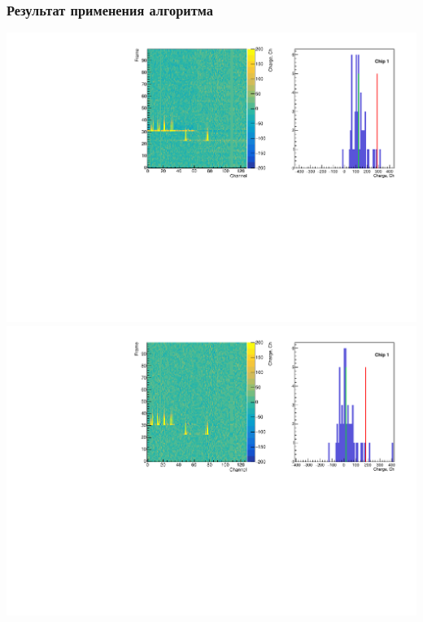 \documentclass[14pt]{beamer}
\newcommand{\backupend}{
	\setcounter{framenumber}{\value{finalframe}}
}
\begin{document}
\begin{frame}[t]
\frametitle{Результат применения алгоритма}
\vspace{0pt}
\centering \includegraphics[height=0.4\textheight, width=0.7\linewidth]{median_hist_unbiased.pdf}
\includegraphics[height=0.4\textheight,width=0.7\linewidth]{median_hist_biased.pdf}
\end{frame}
\backupend
\end{document}
